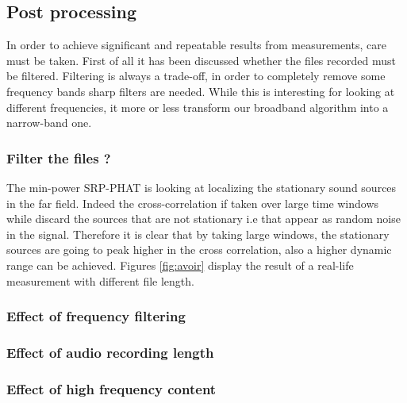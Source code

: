\subsection{Post processing}

In order to achieve significant and repeatable results from measurements, care must be taken. First of all it has been discussed whether the files recorded must be filtered. Filtering is always a trade-off, in order to completely remove some frequency bands sharp filters are needed. While this is interesting for looking at different frequencies, it more or less transform our broadband algorithm into a narrow-band one. 

\subsubsection{Filter the files ?}



The min-power SRP-PHAT is looking at localizing the stationary sound sources in the far field. Indeed the cross-correlation if taken over large time windows while discard the sources that are not stationary i.e that appear as random noise in the signal. Therefore it is clear that by taking large windows, the stationary sources are going to peak higher in the cross correlation, also a higher dynamic range can be achieved. Figures \ref{fig:avoir} display the result of a real-life measurement with different file length.


\subsubsection{Effect of frequency filtering}
\subsubsection{Effect of audio recording length}
\subsubsection{Effect of high frequency content}